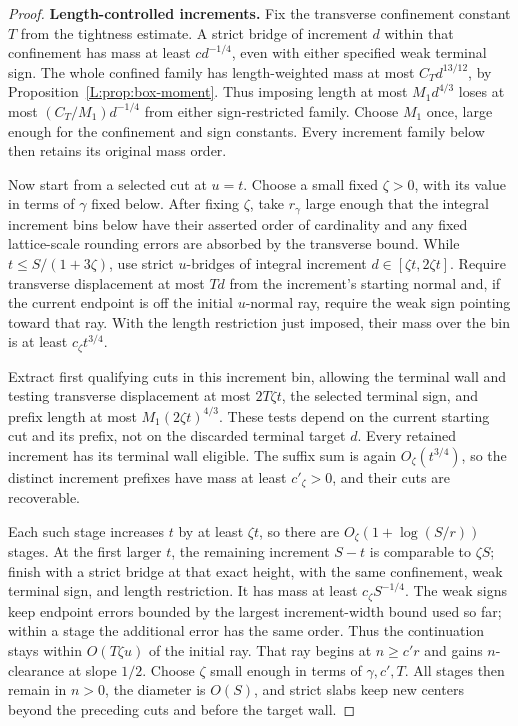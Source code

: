 \documentclass[11pt]{article}
\numberwithin{equation}{section}
\theoremstyle{definition}\newtheorem{definition}[theorem]{Definition}
\theoremstyle{remark}\newtheorem{remark}[theorem]{Remark}
\begin{document}
\begin{proof}
  \textbf{Length-controlled increments.}
Fix the transverse confinement constant \(T\) from the tightness
estimate. A strict bridge of increment \(d\) within that confinement
has mass at least \(cd^{-1/4}\), even with either specified weak
terminal sign. The whole confined family has length-weighted mass
at most \(C_Td^{13/12}\), by Proposition~\ref{L:prop:box-moment}.
Thus imposing length at most \(M_1d^{4/3}\) loses at most
\((C_T/M_1)d^{-1/4}\) from either sign-restricted family. Choose
\(M_1\) once, large enough for the confinement and sign constants.
Every increment family below then retains its original mass order.

Now start from a selected cut at \(u=t\). Choose a small fixed
\(\zeta>0\), with its value in terms of \(\gamma\) fixed below.
After fixing \(\zeta\), take \(r_\gamma\) large enough that the integral
increment bins below have their asserted order of cardinality and any
fixed lattice-scale rounding errors are absorbed by the transverse bound.
While \(t\le S/(1+3\zeta)\), use strict \(u\)-bridges
of integral increment \(d\in[\zeta t,2\zeta t]\). Require transverse
displacement at most \(Td\) from the increment's starting normal and,
if the current endpoint is off the initial \(u\)-normal ray, require
the weak sign pointing toward that ray. With the length restriction
just imposed, their mass over the bin is at least
\(c_\zeta t^{3/4}\).

Extract first qualifying cuts in this increment bin, allowing the
terminal wall and testing
transverse displacement at most \(2T\zeta t\), the selected terminal
sign, and prefix length at most \(M_1(2\zeta t)^{4/3}\).
These tests depend on the current starting cut and its prefix, not on
the discarded terminal target \(d\). Every retained increment has
its terminal wall eligible. The suffix sum is again
\(O_\zeta(t^{3/4})\), so the distinct increment prefixes have mass
at least \(c'_\zeta>0\), and their cuts are recoverable.

Each such stage increases \(t\) by at least \(\zeta t\), so there are
\(O_\zeta(1+\log(S/r))\) stages. At the first larger \(t\), the
remaining increment \(S-t\) is comparable to \(\zeta S\); finish
with a strict bridge at that exact height, with the same confinement,
weak terminal sign, and length restriction. It has mass at least
\(c_\zeta S^{-1/4}\). The weak signs keep endpoint errors bounded
by the largest increment-width bound used so far; within a stage the
additional error has the same order. Thus the continuation stays
within \(O(T\zeta u)\) of the initial ray. That ray begins at
\(n\ge c'r\) and gains \(n\)-clearance at slope \(1/2\).
Choose \(\zeta\) small enough in terms of \(\gamma,c',T\).
All stages then remain in \(n>0\), the diameter is \(O(S)\),
and strict slabs keep new centers beyond the preceding cuts and
before the target wall.


\end{proof}
\end{document}
